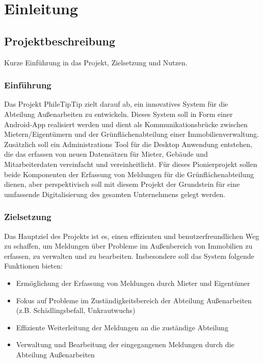 \section{Einleitung}



\subsection{Projektbeschreibung}
Kurze Einführung in das Projekt, Zielsetzung und Nutzen.

\subsubsection{Einführung}

Das Projekt PhileTipTip zielt darauf ab, ein innovatives System für die Abteilung Außenarbeiten zu entwickeln. Dieses System soll in Form einer Android-App realisiert werden und dient als Kommunikationsbrücke zwischen Mietern/Eigentümern und der Grünflächenabteilung einer Immobilienverwaltung. Zusätzlich soll ein Administrations Tool für die Desktop Anwendung entstehen, die das erfassen von neuen Datensätzen für Mieter, Gebäude und Mitarbeiterdaten vereinfacht und vereinheitlicht. Für dieses Pionierprojekt sollen beide Komponenten der Erfassung von Meldungen für die Grünflächenabteilung dienen, aber perspektivisch soll mit diesem Projekt der Grundstein für eine umfassende Digitalisierung des gesamten Unternehmens gelegt werden.

\subsubsection{Zielsetzung}

Das Hauptziel des Projekts ist es, einen effizienten und benutzerfreundlichen Weg zu schaffen, um Meldungen über Probleme im Außenbereich von Immobilien zu erfassen, zu verwalten und zu bearbeiten. Insbesondere soll das System folgende Funktionen bieten:
\begin{itemize}
  \item  Ermöglichung der Erfassung von Meldungen durch Mieter und Eigentümer
  \item  Fokus auf Probleme im Zuständigkeitsbereich der Abteilung Außenarbeiten (z.B. Schädlingsbefall, Unkrautwuchs)
  \item  Effiziente Weiterleitung der Meldungen an die zuständige Abteilung
  \item  Verwaltung und Bearbeitung der eingegangenen Meldungen durch die Abteilung Außenarbeiten
\end{itemize}

